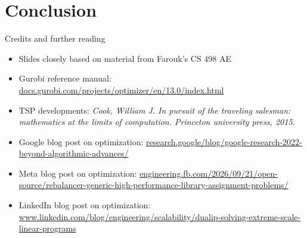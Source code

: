 \documentclass[aspectratio=169, handout]{beamer}
\begin{document}
\section{Conclusion}

\begin{frame}{Credits and further reading}
    \begin{itemize}
        \item Slides closely based on material from Farouk's CS 498 AE
        \item Gurobi reference manual: {\small \url{docs.gurobi.com/projects/optimizer/en/13.0/index.html}}
        \item TSP developments: {\small \emph{Cook, William J. In pursuit of the traveling salesman: mathematics at the limits of computation. Princeton university press, 2015.}}
        \item Google blog post on optimization: {\small \url{research.google/blog/google-research-2022-beyond-algorithmic-advances/}}
        \item Meta blog post on optimization: {\small \url{engineering.fb.com/2026/09/21/open-source/rebalancer-generic-high-performance-library-assignment-problems/}}
        \item LinkedIn blog post on optimization: {\small \url{www.linkedin.com/blog/engineering/scalability/dualip-solving-extreme-scale-linear-programs}}
    \end{itemize}
\end{frame}





\end{document}
